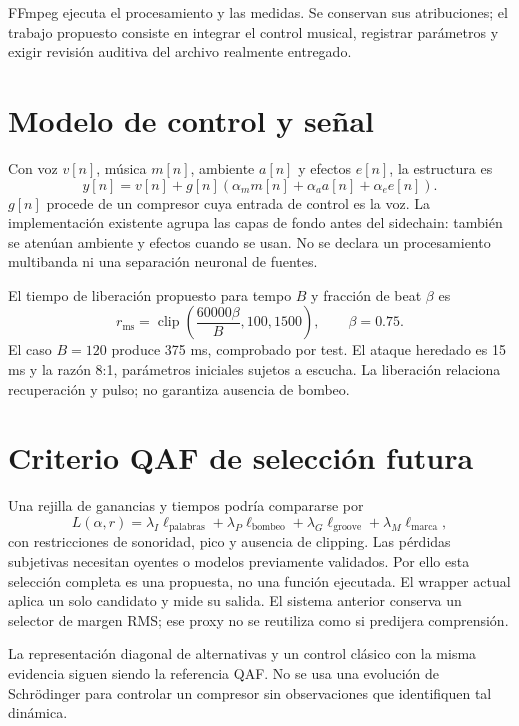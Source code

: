 \documentclass[11pt,a4paper]{article}
\begin{document}
FFmpeg ejecuta el procesamiento y las medidas. Se conservan sus atribuciones; el trabajo propuesto consiste en integrar el control musical, registrar parámetros y exigir revisión auditiva del archivo realmente entregado.

\newpage
\section{Modelo de control y señal}
Con voz $v[n]$, música $m[n]$, ambiente $a[n]$ y efectos $e[n]$, la estructura es
\begin{equation}
 y[n]=v[n]+g[n](\alpha_m m[n]+\alpha_a a[n]+\alpha_e e[n]).
\end{equation}
$g[n]$ procede de un compresor cuya entrada de control es la voz. La implementación existente agrupa las capas de fondo antes del sidechain: también se atenúan ambiente y efectos cuando se usan. No se declara un procesamiento multibanda ni una separación neuronal de fuentes.

El tiempo de liberación propuesto para tempo $B$ y fracción de beat $\beta$ es
\begin{equation}
 r_{\mathrm{ms}}=\operatorname{clip}\left(\frac{60000\beta}{B},100,1500\right),
 \qquad \beta=0.75.
\end{equation}
El caso $B=120$ produce 375 ms, comprobado por test. El ataque heredado es 15 ms y la razón 8:1, parámetros iniciales sujetos a escucha. La liberación relaciona recuperación y pulso; no garantiza ausencia de bombeo.
\section{Criterio QAF de selección futura}
Una rejilla de ganancias y tiempos podría compararse por
\begin{equation}
 L(\alpha,r)=\lambda_I\ell_{\mathrm{palabras}}+\lambda_P\ell_{\mathrm{bombeo}}+
 \lambda_G\ell_{\mathrm{groove}}+\lambda_M\ell_{\mathrm{marca}},
\end{equation}
con restricciones de sonoridad, pico y ausencia de clipping. Las pérdidas subjetivas necesitan oyentes o modelos previamente validados. Por ello esta selección completa es una propuesta, no una función ejecutada. El wrapper actual aplica un solo candidato y mide su salida. El sistema anterior conserva un selector de margen RMS; ese proxy no se reutiliza como si predijera comprensión.

La representación diagonal de alternativas y un control clásico con la misma evidencia siguen siendo la referencia QAF. No se usa una evolución de Schrödinger para controlar un compresor sin observaciones que identifiquen tal dinámica.
\end{document}
